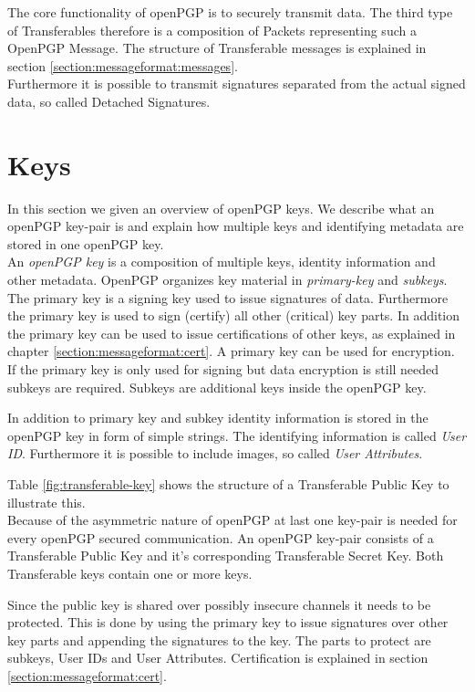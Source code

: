 The core functionality of openPGP is to securely transmit data. The third type of Transferables therefore is a composition of Packets representing such a OpenPGP Message. The structure of Transferable messages is explained in section \ref{section:messageformat:messages}. \\

Furthermore it is possible to transmit signatures separated from the actual signed data, so called Detached Signatures.

\section{Keys}
\label{section:messageformat:keys}

In this section we given an overview of openPGP keys. We describe what an openPGP key-pair is and explain how multiple keys and identifying metadata are stored in one openPGP key. \\

An \textit{openPGP key} is a composition of multiple keys, identity information and other metadata. OpenPGP organizes key material in \textit{primary-key} and \textit{subkeys}. The primary key is a signing key used to issue signatures of data. Furthermore the primary key is used to sign (certify) all other (critical) key parts. In addition the primary key can be used to issue certifications of other keys, as explained in chapter \ref{section:messageformat:cert}. A primary key can be used for encryption. If the primary key is only used for  signing but data encryption is still needed subkeys are required. Subkeys are additional keys inside the openPGP key. 

In addition to primary key and subkey identity information is stored in the openPGP key in form of simple strings. The identifying information is called \textit{User ID}. Furthermore it is possible to include images, so called \textit{User Attributes}. 

Table \ref{fig:transferable-key} shows the structure of a Transferable Public Key to illustrate this. \\

Because of the  asymmetric nature of openPGP at last one key-pair is needed for every openPGP secured communication. An openPGP key-pair consists of a Transferable Public Key and it's corresponding Transferable Secret Key. Both Transferable keys contain one or more keys. 


Since the public key is shared over possibly insecure channels it needs to be protected. This is done by using the primary key to issue signatures over other key parts and appending the signatures to the key. The parts to protect are subkeys, User IDs and User Attributes. Certification is explained in section \ref{section:messageformat:cert}. \\


